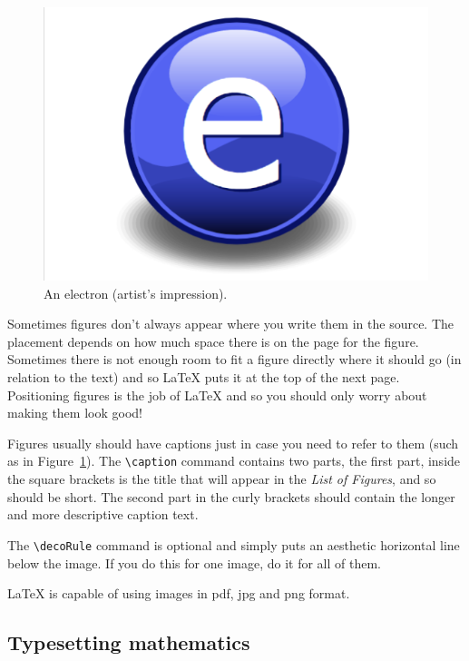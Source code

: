 \begin{figure}[th]
    \centering
    \includegraphics{image/Electron}
    \decoRule
    \caption[An Electron]{An electron (artist's impression).}
    \label{fig:Electron}
\end{figure}

Sometimes figures don't always appear where you write them in the source. The
placement depends on how much space there is on the page for the figure.
Sometimes there is not enough room to fit a figure directly where it should go
(in relation to the text) and so \LaTeX{} puts it at the top of the next page.
Positioning figures is the job of \LaTeX{} and so you should only worry about
making them look good!

Figures usually should have captions just in case you need to refer to them
(such as in Figure~\ref{fig:Electron}). The \verb|\caption| command contains
two parts, the first part, inside the square brackets is the title that will
appear in the \emph{List of Figures}, and so should be short. The second part
in the curly brackets should contain the longer and more descriptive caption
text.

The \verb|\decoRule| command is optional and simply puts an aesthetic
horizontal line below the image. If you do this for one image, do it for all of
them.

\LaTeX{} is capable of using images in pdf, jpg and png format.

\subsection{Typesetting mathematics}


